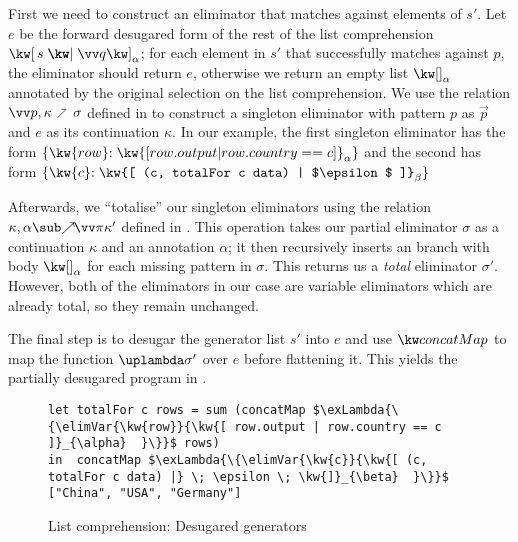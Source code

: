 First we need to construct an eliminator that matches against elements of $s'$. Let $e$ be the forward desugared form of the rest of the list comprehension $\annListComp{s}{\vec{q}}{\alpha}$; for each element in $s'$ that successfully matches against $p$, the eliminator should return $e$, otherwise we return an empty list $\annNil{\alpha}$ annotated by the original selection on the list comprehension. We use the relation $\vec{p}, \kappa \clauseFwdR \sigma$ defined in  to construct a singleton eliminator with pattern $p$ as $\vec{p}$ and $e$  as its continuation $\kappa$. In our example, the first singleton eliminator has the form $\{\elimVar{\kw{row}}{\kw{[ row.output | row.country == c ]}_{\alpha} }\}$ and the second has form $\{\elimVar{\kw{c}}{\kw{[ (c, totalFor c data) | $\epsilon$ ]}_{\beta}}\}$

Afterwards, we ``totalise'' our singleton eliminators using the relation $\totaliseFwd{\kappa}{\alpha}{\vec{\pi}}{\kappa'}$ defined in . This operation takes our partial eliminator $\sigma$ as a continuation $\kappa$ and an annotation $\alpha$; it then recursively inserts an branch with body $\annNil{\alpha}$ for each missing pattern in $\sigma$. This returns us a \textit{total} eliminator $\sigma'$. However, both of the eliminators in our case are variable eliminators which are already total, so they remain unchanged.

The final step is to desugar the generator list $s'$ into $e$ and use $\funConcatMap$ to map the function $\exLambda{\sigma'}$ over $e$ before flattening it. This yields the partially desugared program in .


\begin{figure}[H]
\small
\begin{lstlisting}
let totalFor c rows = sum (concatMap $\exLambda{\{\elimVar{\kw{row}}{\kw{[ row.output | row.country == c ]}_{\alpha}  }\}}$ rows)
in  concatMap $\exLambda{\{\elimVar{\kw{c}}{\kw{[ (c, totalFor c data) |} \; \epsilon \; \kw{]}_{\beta}  }\}}$ ["China", "USA", "Germany"]
\end{lstlisting}
\caption{List comprehension: Desugared generators}
\label{fig:surface-language:example-2}
\end{figure}


